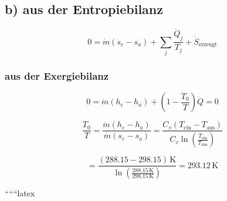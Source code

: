 \subsection*{b) aus der Entropiebilanz}

\[
0 = \dot{m} (s_e - s_a) + \sum_j \frac{\dot{Q}_j}{T_j} + \dot{S}_{\text{erzeugt}}
\]

\subsubsection*{aus der Exergiebilanz}

\[
0 = \dot{m} (h_e - h_a) + \left( 1 - \frac{T_0}{T} \right) \dot{Q} = 0
\]

\[
\frac{T_0}{T} = \frac{\dot{m} (h_e - h_a)}{\dot{m} (s_e - s_a)} = \frac{C_v (T_{\text{ein}} - T_{\text{aus}})}{C_v \ln \left( \frac{T_{\text{ein}}}{T_{\text{aus}}} \right)}
\]

\[
= \frac{(288.15 - 298.15) \, \text{K}}{\ln \left( \frac{288.15 \, \text{K}}{298.15 \, \text{K}} \right)} = 293.12 \, \text{K}
\]

``````latex